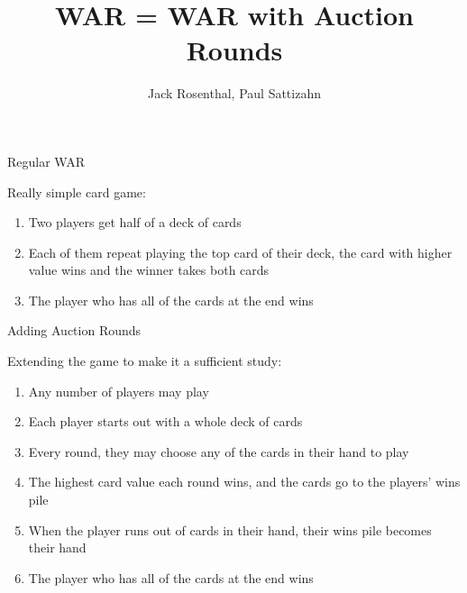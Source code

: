 \documentclass{beamer}
\title{WAR = WAR with Auction Rounds}
\author{Jack Rosenthal, Paul Sattizahn}
\institute{CSCI-410: Game Theory \& Networks}
\begin{document}
\begin{frame}
    \maketitle
\end{frame}

\begin{frame}{Regular WAR}

    Really simple card game:

    \begin{enumerate}
        \item Two players get half of a deck of cards
        \item Each of them repeat playing the top card of their deck, the card
            with higher value wins and the winner takes both cards
        \item The player who has all of the cards at the end wins
    \end{enumerate}

\end{frame}

\begin{frame}{Adding Auction Rounds}

    Extending the game to make it a sufficient study:

    \begin{enumerate}
        \item Any number of players may play
        \item Each player starts out with a whole deck of cards
        \item Every round, they may choose any of the cards in their hand to
            play
        \item The highest card value each round wins, and the cards go to the
            players' wins pile
        \item When the player runs out of cards in their hand, their wins pile
            becomes their hand
        \item The player who has all of the cards at the end wins
    \end{enumerate}

\end{frame}
\end{document}
